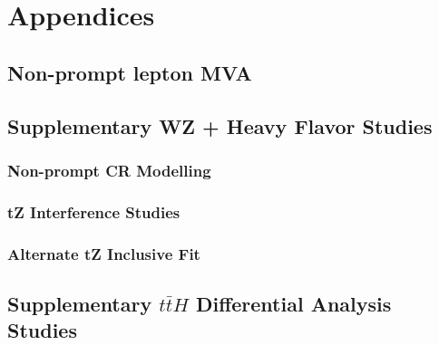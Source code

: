 \documentclass[12pt]{report}	%
\theoremstyle{definition}
\theoremstyle{remark}
\begin{document}
%
%
\appendices
{}%
\chapter{Appendices}

\section{Non-prompt lepton MVA}
\label{sec:lepMVA}


\section{Supplementary WZ + Heavy Flavor Studies}
\label{apx:WZ}

\subsection{Non-prompt CR Modelling}
\label{sec:fakeCR_plots}


\subsection{tZ Interference Studies}
\label{sec:tZInt}

                                                                                                                             
\subsection{Alternate tZ Inclusive Fit}
\label{sec:inc_tZ}

                                                                                                                             
\section{Supplementary $t\bar{t}H$ Differential Analysis Studies}                                                            
\label{apx:MVA}                                                                                        
                                                                                    
% 
\end{document}
